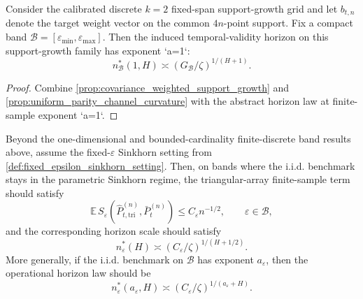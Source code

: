 \begin{theorem}
\label{thm:calibrated_support_growth_band_law}
Consider the calibrated discrete $k=2$ fixed-span support-growth grid and let
$b_{t,n}$ denote the target weight vector on the common $4n$-point support. Fix
a compact band $\mathcal B=[\varepsilon_{\min},\varepsilon_{\max}]$. Then the
induced temporal-validity horizon on this support-growth family has exponent
`a=1`:
\[
  n^*_{\mathcal B}(1,H)
  \asymp (G_{\mathcal B}/\zeta)^{1/(H+1)}.
\]
\end{theorem}

\begin{proof}
Combine \cref{prop:covariance_weighted_support_growth} and
\cref{prop:uniform_parity_channel_curvature} with the abstract horizon law at
finite-sample exponent `a=1`.
\end{proof}

\begin{conjecture}
\label{conj:embedded_sinkhorn_horizon}
Beyond the one-dimensional and bounded-cardinality finite-discrete band results above, assume the fixed-$\varepsilon$ Sinkhorn setting from
\cref{def:fixed_epsilon_sinkhorn_setting}. Then, on bands where the i.i.d.
benchmark stays in the parametric Sinkhorn regime, the triangular-array
finite-sample term should satisfy
\[
  \mathbb E\,S_{\varepsilon}\!\left(\widehat P_{t,\mathrm{tri}}^{(n)},\bar P_t^{(n)}\right)
  \le C_{\varepsilon} n^{-1/2},
  \qquad \varepsilon\in\mathcal B,
\]
and the corresponding horizon scale should satisfy
\[
  n_{\varepsilon}^*(H) \asymp (C_{\varepsilon}/\zeta)^{1/(H+1/2)}.
\]
More generally, if the i.i.d. benchmark on $\mathcal B$ has exponent
$a_{\varepsilon}$, then the operational horizon law should be
\[
  n_{\varepsilon}^*(a_{\varepsilon},H)
  \asymp (C_{\varepsilon}/\zeta)^{1/(a_{\varepsilon}+H)}.
\]
\end{conjecture}

